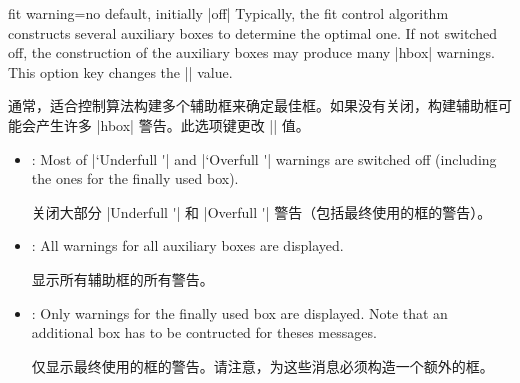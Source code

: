 \begin{docTcbKey}{fit warning}{=}{no default, initially |off|}
Typically, the fit control algorithm constructs several auxiliary boxes
to determine the optimal one. If not switched off, the construction of
the auxiliary boxes may produce many |hbox| warnings. This option key
changes the |\hbadness| value.

通常，适合控制算法构建多个辅助框来确定最佳框。如果没有关闭，构建辅助框可能会产生许多 |hbox| 警告。此选项键更改 |\hbadness| 值。
  \begin{itemize}
  \item{}: Most of |`Underfull \hbox'| and |`Overfull \hbox'| warnings are
    switched off (including the ones for the finally used box).

    关闭大部分 |Underfull \hbox'| 和 |Overfull \hbox'| 警告（包括最终使用的框的警告）。
  \item{}: All warnings for all auxiliary boxes are displayed.

  显示所有辅助框的所有警告。
  \item{}: Only warnings for the finally used box are displayed.
    Note that an additional box has to be contructed for theses messages.

    仅显示最终使用的框的警告。请注意，为这些消息必须构造一个额外的框。
  \end{itemize}
\end{docTcbKey}

 